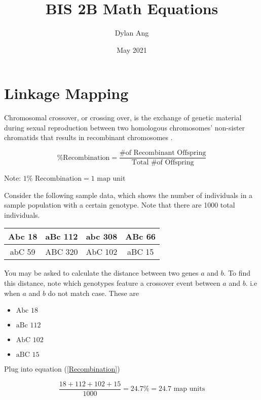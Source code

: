 \documentclass[12pt]{article}
\title{BIS 2B Math Equations}
\date{May 2021}
\author{Dylan Ang}
\begin{document}
\maketitle

\tableofcontents

\section{Linkage Mapping}

Chromosomal crossover, or crossing over, is the exchange of genetic material during sexual reproduction between two homologous chromosomes' non-sister chromatids that results in recombinant chromosomes \cite{crossover}.

\begin{equation}\label{Recombination}
    \text{\% Recombination} = \frac{\text{\# of Recombinant Offspring}}{\text{Total \# of Offspring}}
\end{equation}

Note: $1\% \text{ Recombination} = \text{1 map unit}$

Consider the following sample data, which shows the number of individuals in a sample population with a certain genotype. Note that there are 1000 total individuals.

\begin{table}[ht]
    \centering
    \begin{tabular}{*4{|c}|}
        \hline
        Abc 18 & aBc 112 & abc 308 & ABc 66 \\ \hline
        abC 59 & ABC 320 & AbC 102 & aBC 15 \\ \hline
    \end{tabular}
\end{table}

You may be asked to calculate the distance between two genes $a$ and $b$. To find this distance, note which genotypes feature a crossover event between $a$ and $b$. i.e when $a$ and $b$ do not match case. These are

\begin{itemize}
    \item $\text{Abc } 18$
    \item $\text{aBc } 112$
    \item $\text{AbC } 102$
    \item $\text{aBC } 15$
\end{itemize}

Plug into equation (\ref{Recombination})

$$\frac{18+112+102+15}{1000} = 24.7\% = 24.7 \text{ map units}$$
\end{document}

